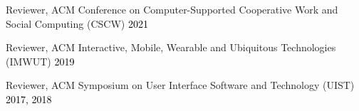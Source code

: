 \documentclass[10pt,A4]{article}
\newcommand{\mystrut}{\rule[-.3\baselineskip]{0pt}{\baselineskip}}
\begin{document}
Reviewer, ACM Conference on Computer-Supported Cooperative Work and Social Computing (CSCW) \hfill \textcolor{black}{2021}

Reviewer, ACM Interactive, Mobile, Wearable and Ubiquitous Technologies (IMWUT) \hfill \textcolor{black}{2019}

Reviewer, ACM Symposium on User Interface Software and Technology (UIST) \hfill \textcolor{black}{2017, 2018}\\

%

%

%











%
%
%
%
%
%
\end{document}
